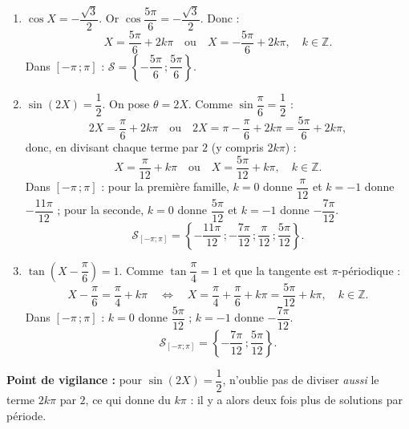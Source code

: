 \documentclass[11pt]{article}
\begin{document}
\begin{corrige}
\begin{enumerate}
\item $\cos X=-\dfrac{\sqrt{3}}{2}$. Or $\cos\dfrac{5\pi}{6}=-\dfrac{\sqrt{3}}{2}$. Donc :
\[X=\dfrac{5\pi}{6}+2k\pi\quad\text{ou}\quad X=-\dfrac{5\pi}{6}+2k\pi,\quad k\in\mathbb{Z}.\]
Dans $[-\pi\,;\pi]$ : $\mathcal{S}=\left\{-\dfrac{5\pi}{6}\,;\dfrac{5\pi}{6}\right\}$.
\item $\sin(2X)=\dfrac{1}{2}$. On pose $\theta=2X$. Comme $\sin\dfrac{\pi}{6}=\dfrac{1}{2}$ :
\[2X=\dfrac{\pi}{6}+2k\pi\quad\text{ou}\quad 2X=\pi-\dfrac{\pi}{6}+2k\pi=\dfrac{5\pi}{6}+2k\pi,\]
donc, en divisant chaque terme par $2$ (y compris $2k\pi$) :
\[X=\dfrac{\pi}{12}+k\pi\quad\text{ou}\quad X=\dfrac{5\pi}{12}+k\pi,\quad k\in\mathbb{Z}.\]
Dans $[-\pi\,;\pi]$ : pour la première famille, $k=0$ donne $\dfrac{\pi}{12}$ et $k=-1$ donne $-\dfrac{11\pi}{12}$ ; pour la seconde, $k=0$ donne $\dfrac{5\pi}{12}$ et $k=-1$ donne $-\dfrac{7\pi}{12}$.
\[\mathcal{S}_{[-\pi;\pi]}=\left\{-\dfrac{11\pi}{12}\,;-\dfrac{7\pi}{12}\,;\dfrac{\pi}{12}\,;\dfrac{5\pi}{12}\right\}.\]
\item $\tan\left(X-\dfrac{\pi}{6}\right)=1$. Comme $\tan\dfrac{\pi}{4}=1$ et que la tangente est $\pi$-périodique :
\[X-\dfrac{\pi}{6}=\dfrac{\pi}{4}+k\pi\quad\Longleftrightarrow\quad X=\dfrac{\pi}{4}+\dfrac{\pi}{6}+k\pi=\dfrac{5\pi}{12}+k\pi,\quad k\in\mathbb{Z}.\]
Dans $[-\pi\,;\pi]$ : $k=0$ donne $\dfrac{5\pi}{12}$ ; $k=-1$ donne $-\dfrac{7\pi}{12}$.
\[\mathcal{S}_{[-\pi;\pi]}=\left\{-\dfrac{7\pi}{12}\,;\dfrac{5\pi}{12}\right\}.\]
\end{enumerate}
\textbf{Point de vigilance :} pour $\sin(2X)=\dfrac{1}{2}$, n'oublie pas de diviser \emph{aussi} le terme $2k\pi$ par $2$, ce qui donne du $k\pi$ : il y a alors deux fois plus de solutions par période.
\end{corrige}
\end{document}
